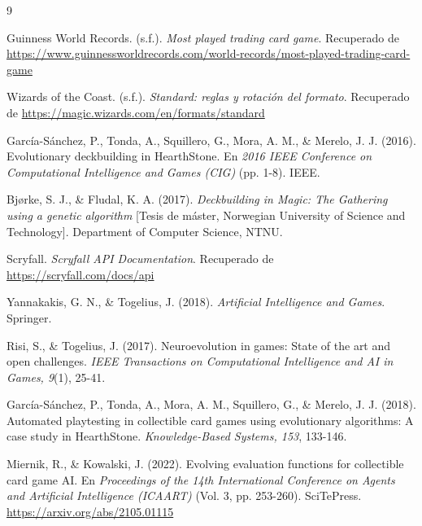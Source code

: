 
\begin{thebibliography}{9}

Guinness World Records. (s.f.). \textit{Most played trading card game}. Recuperado de \url{https://www.guinnessworldrecords.com/world-records/most-played-trading-card-game}

Wizards of the Coast. (s.f.). \textit{Standard: reglas y rotación del formato}. Recuperado de \url{https://magic.wizards.com/en/formats/standard}

García-Sánchez, P., Tonda, A., Squillero, G., Mora, A. M., \& Merelo, J. J. (2016). Evolutionary deckbuilding in HearthStone. En \textit{2016 IEEE Conference on Computational Intelligence and Games (CIG)} (pp. 1-8). IEEE.

Bjørke, S. J., \& Fludal, K. A. (2017). \textit{Deckbuilding in Magic: The Gathering using a genetic algorithm} [Tesis de máster, Norwegian University of Science and Technology]. Department of Computer Science, NTNU.

Scryfall. \textit{Scryfall API Documentation}. Recuperado de \url{https://scryfall.com/docs/api}

Yannakakis, G. N., \& Togelius, J. (2018). \textit{Artificial Intelligence and Games}. Springer.

Risi, S., \& Togelius, J. (2017). Neuroevolution in games: State of the art and open challenges. \textit{IEEE Transactions on Computational Intelligence and AI in Games, 9}(1), 25-41.

García-Sánchez, P., Tonda, A., Mora, A. M., Squillero, G., \& Merelo, J. J. (2018). Automated playtesting in collectible card games using evolutionary algorithms: A case study in HearthStone. \textit{Knowledge-Based Systems, 153}, 133-146.

Miernik, R., \& Kowalski, J. (2022). Evolving evaluation functions for collectible card game AI. En \textit{Proceedings of the 14th International Conference on Agents and Artificial Intelligence (ICAART)} (Vol. 3, pp. 253-260). SciTePress. \url{https://arxiv.org/abs/2105.01115}


\end{thebibliography}
